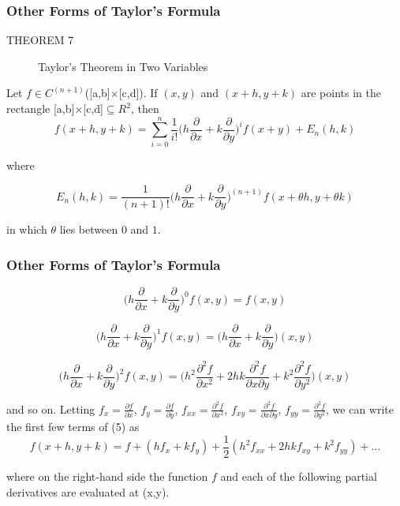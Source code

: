 \documentclass[notheorems,mathserif,table,compress]{beamer}  %
\begin{document}
\begin{frame}
\frametitle{Other Forms of Taylor's Formula}
\begin{description}
\item[THEOREM 7] \textsf{Taylor's Theorem in Two Variables}
\end{description}
Let $f \in C^{(n+1)}$([a,b]×[c,d]). If $(x,y)$ and $(x+h,y+k)$ are points in the rectangle [a,b]×[c,d]$\subseteq R^2$, then
\begin{displaymath}
f(x+h,y+k) = \sum_{i=0}^n\frac{1}{i!}\bigg(h\frac{\partial}{\partial x}+k\frac{\partial}{\partial y}\bigg)^if(x+y)+E_n(h,k)
\end{displaymath}

where

\begin{displaymath}
E_n(h,k)=\frac{1}{(n+1)!}\bigg(h\frac{\partial}{\partial x}+k\frac{\partial}{\partial y}\bigg)^{(n+1)}f(x+\theta h,y+\theta k)
\end{displaymath}

in which $\theta$ lies between $0$ and $1$.
\end{frame}

\begin{frame}
\frametitle{Other Forms of Taylor's Formula}
\begin{displaymath}
\bigg(h\frac{\partial}{\partial x}+k\frac{\partial}{\partial y}\bigg)^0f(x,y)=f(x,y)
\end{displaymath}

\begin{displaymath}
\bigg(h\frac{\partial}{\partial x}+k\frac{\partial}{\partial y}\bigg)^1f(x,y)=\bigg(h\frac{\partial}{\partial x}+k\frac{\partial}{\partial y}\bigg)(x,y)
\end{displaymath}

\begin{displaymath}
\bigg(h\frac{\partial}{\partial x}+k\frac{\partial}{\partial y}\bigg)^2f(x,y)=\bigg(h^2\frac{\partial^2f}{\partial x^2}+2hk\frac{\partial^2f}{\partial x\partial y}+k^2\frac{\partial^2f}{\partial y^2}\bigg)(x,y)
\end{displaymath}

and so on. Letting $f_x=\frac{\partial f}{\partial x}$, $f_y=\frac{\partial f}{\partial y}$, $f_{xx}=\frac{\partial^2f}{\partial x^2}$, $f_{xy}=\frac{\partial^2f}{\partial x \partial y}$, $f_{yy}=\frac{\partial^2f}{\partial y^2}$, we can write the first few terms of (5) as 
\begin{displaymath}
f(x+h,y+k)=f+(hf_x+kf_y)+\frac{1}{2}(h^2 f_{xx}+2hkf_{xy}+k^2f_{yy})+\ldots
\end{displaymath}

where on the right-hand side the function $f$ and each of the following partial derivatives are evaluated at (x,y).
\end{frame}
 
\end{document}
